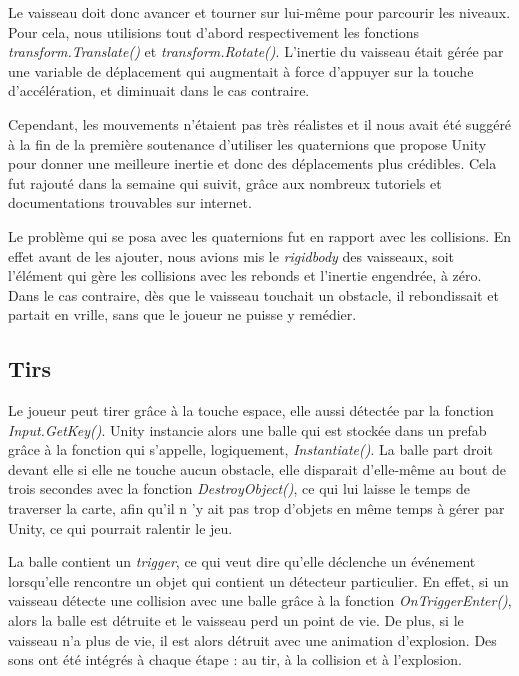 \documentclass[12pt, titlepage]{article}
\begin{document}
\begin{spacing}{1.5}
Le vaisseau doit donc avancer et tourner sur lui-même pour parcourir les niveaux. Pour cela, nous utilisions tout d'abord respectivement les fonctions \textit{transform.Translate()} et \textit{transform.Rotate()}. L'inertie du vaisseau était gérée par une variable de déplacement qui augmentait à force d'appuyer sur la touche d'accélération, et diminuait dans le cas contraire.

Cependant, les mouvements n'étaient pas très réalistes et il nous avait été suggéré à la fin de la première soutenance d'utiliser les quaternions que propose Unity pour donner une meilleure inertie et donc des déplacements plus crédibles. Cela fut rajouté dans la semaine qui suivit, grâce aux nombreux tutoriels et documentations trouvables sur internet.

Le problème qui se posa avec les quaternions fut en rapport avec les collisions. En effet avant de les ajouter, nous avions mis le \textit{rigidbody} des vaisseaux, soit l'élément qui gère les collisions avec les rebonds et l'inertie engendrée, à zéro. Dans le cas contraire, dès que le vaisseau touchait un obstacle, il rebondissait et partait en vrille, sans que le joueur ne puisse y remédier.

\subsection{Tirs}

Le joueur peut tirer grâce à la touche espace, elle aussi détectée par la fonction \textit{Input.GetKey()}. Unity instancie alors une balle qui est stockée dans un prefab grâce à la fonction qui s'appelle, logiquement, \textit{Instantiate()}. La balle part droit devant elle si elle ne touche aucun obstacle, elle disparait d'elle-même au bout de trois secondes avec la fonction \textit{DestroyObject()}, ce qui lui laisse le temps de traverser la carte, afin qu'il n 'y ait pas trop d'objets en même temps à gérer par Unity, ce qui pourrait ralentir le jeu.

La balle contient un \textit{trigger}, ce qui veut dire qu'elle déclenche un événement lorsqu'elle rencontre un objet qui contient un détecteur particulier. En effet, si un vaisseau détecte une collision avec une balle grâce à la fonction \textit{OnTriggerEnter()}, alors la balle est détruite et le vaisseau perd un point de vie. De plus, si le vaisseau n'a plus de vie, il est alors détruit avec une animation d'explosion. Des sons ont été intégrés à chaque étape : au tir, à la collision et à l'explosion.


\end{spacing}
\end{document}
